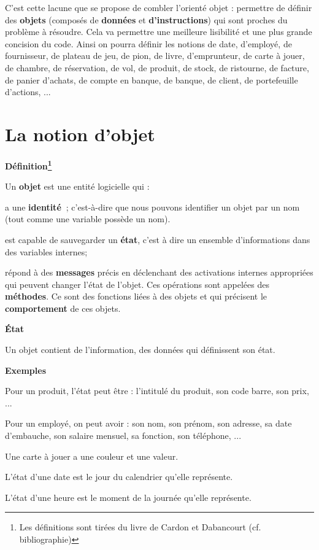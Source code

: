 	C'est cette lacune que se propose de combler
	l'orienté objet : permettre de définir des
	\textbf{objets} (composés de \textbf{données} et
	\textbf{d'instructions}) qui sont proches du problème
	à résoudre. Cela va permettre une meilleure lisibilité et une plus
	grande concision du code. Ainsi on pourra définir les notions de date,
	d'employé, de fournisseur, de plateau de jeu, de pion,
	de livre, d'emprunteur, de carte à jouer, de chambre,
	de réservation, de vol, de produit, de stock, de ristourne, de facture,
	de panier d'achats, de compte en banque, de banque, de
	client, de portefeuille d'actions, ...


\section{La notion d'objet}

{\sffamily\bfseries\upshape
Définition\footnote{Les définitions sont tirées du livre de Cardon et
Dabancourt (cf. bibliographie)}}

Un \textbf{objet} est une entité logicielle qui :

\begin{liste}
	\item 
		a une \textbf{identité~}; c'est-à-dire que nous pouvons
		identifier un objet par un nom (tout comme une variable possède un
		nom).
	\item 
		est capable de sauvegarder un \textbf{état}, c'est à
		dire un ensemble d'informations dans des variables
		internes;
	\item 
		répond à des \textbf{messages} précis en déclenchant des activations
		internes appropriées qui peuvent changer l'état de
		l'objet. Ces opérations sont appelées des
		\textbf{méthodes}. Ce sont des fonctions liées à des objets et qui
		précisent le \textbf{comportement} de ces objets.
\end{liste}

{\sffamily\bfseries\upshape
État}

Un objet contient de l'information, des données qui
définissent son état.

{\bfseries
Exemples}

\begin{liste}
	\item 
		Pour un produit, l'état peut être :
		l'intitulé du produit, son code barre, son prix, ... 
	\item 
		Pour un employé, on peut avoir : son nom, son prénom, son adresse, sa
		date d'embauche, son salaire mensuel, sa fonction, son
		téléphone, ... 
	\item 
		Une carte à jouer a une couleur et une valeur.
	\item 
		L'état d'une date est le jour du
		calendrier qu'elle représente.
	\item 
		L'état d'une heure est le moment de la
		journée qu'elle représente.
\end{liste}

